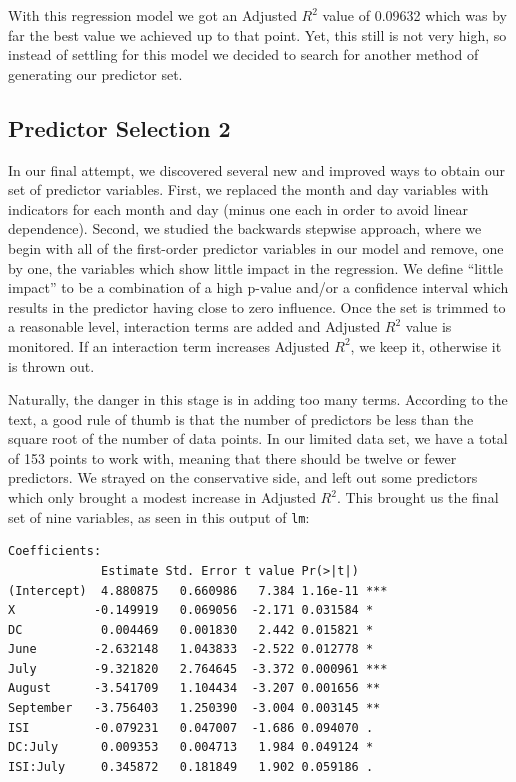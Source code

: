 \documentclass{article}
\begin{document}
With this regression model we got an Adjusted $R^{2}$ value of 0.09632 which
was by far the best value we achieved up to that point. Yet, this still is not
very high, so instead of settling for this model we decided to search for
another method of generating our predictor set.

\subsection{Predictor Selection 2}

In our final attempt, we discovered several new and improved ways to obtain our
set of predictor variables. First, we replaced the month and day variables with
indicators for each month and day (minus one each in order to avoid linear
dependence). Second, we studied the backwards stepwise approach, where we begin
with all of the first-order predictor variables in our model and remove, one by
one, the variables which show little impact in the regression. We define
``little impact'' to be a combination of a high p-value and/or a confidence
interval which results in the predictor having close to zero influence. Once
the set is trimmed to a reasonable level, interaction terms are added and
Adjusted $R^2$ value is monitored. If an interaction term increases Adjusted
$R^2$, we keep it, otherwise it is thrown out. 

Naturally, the danger in this stage is in adding too many terms. According to
the text, a good rule of thumb is that the number of predictors be less than
the square root of the number of data points. In our limited data set, we have
a total of 153 points to work with, meaning that there should be twelve or
fewer predictors. We strayed on the conservative side, and left out some
predictors which only brought a modest increase in Adjusted $R^2$. This brought
us the final set of nine variables, as seen in this output of \verb=lm=:

\begin{verbatim}
Coefficients:
             Estimate Std. Error t value Pr(>|t|)    
(Intercept)  4.880875   0.660986   7.384 1.16e-11 ***
X           -0.149919   0.069056  -2.171 0.031584 *  
DC           0.004469   0.001830   2.442 0.015821 *  
June        -2.632148   1.043833  -2.522 0.012778 *  
July        -9.321820   2.764645  -3.372 0.000961 ***
August      -3.541709   1.104434  -3.207 0.001656 ** 
September   -3.756403   1.250390  -3.004 0.003145 ** 
ISI         -0.079231   0.047007  -1.686 0.094070 .  
DC:July      0.009353   0.004713   1.984 0.049124 *  
ISI:July     0.345872   0.181849   1.902 0.059186 .  
\end{verbatim}
\end{document}
